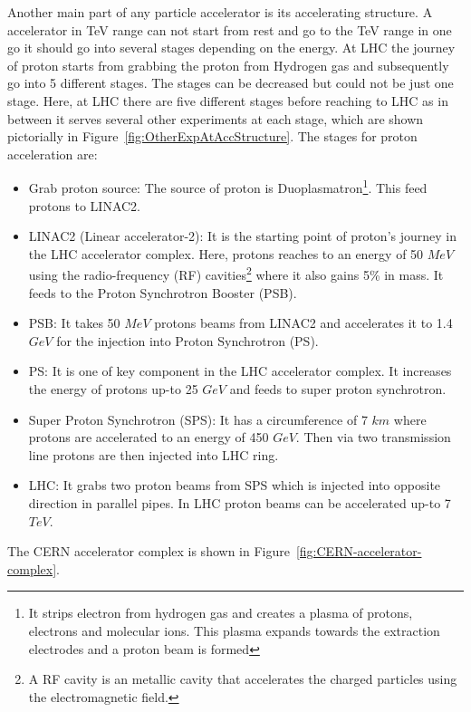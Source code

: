 Another main part of any particle accelerator is its accelerating structure. A accelerator in TeV range can not start from rest and go to the TeV range in one go it should go into several stages depending on the energy. At LHC the journey of proton starts from grabbing the proton from Hydrogen gas and subsequently go into 5 different stages. The stages can be decreased but could not be just one stage. Here, at LHC there are five different stages before reaching to LHC as in between it serves several other experiments at each stage, which are shown pictorially in Figure~\ref{fig:OtherExpAtAccStructure}. The stages for proton acceleration are:
\begin{itemize}
    \item Grab proton source: The source of proton is Duoplasmatron\footnote{It strips electron from hydrogen gas and creates a plasma of protons, electrons and molecular ions. This plasma expands towards the extraction electrodes and a proton beam is formed}\cite{LHC-tdr-vol3}. This feed protons to LINAC2.
    \item LINAC2 (Linear accelerator-2): It is the starting point of proton's journey in the LHC accelerator complex. Here, protons reaches to an energy of 50 $MeV$ using the radio-frequency (RF) cavities\footnote{A RF cavity is an metallic cavity that accelerates the charged particles using the electromagnetic field.} where it also gains 5\% in mass. It feeds to the Proton Synchrotron Booster (PSB).
    \item PSB: It takes 50 $MeV$ protons beams from LINAC2 and accelerates it to 1.4 $GeV$ for the injection into Proton Synchrotron (PS).
    \item PS: It is one of key component in the LHC accelerator complex. It increases the energy of protons up-to 25 $GeV$ and feeds to super proton synchrotron.
    \item Super Proton Synchrotron (SPS): It has a circumference of 7 $km$ where protons are accelerated to an energy of 450 $GeV$. Then via two transmission line protons are then injected into LHC ring.
    \item LHC: It grabs two proton beams from SPS which is injected into opposite direction in parallel pipes. In LHC proton beams can be accelerated up-to 7 $TeV$.
\end{itemize}
The CERN accelerator complex is shown in Figure~\ref{fig:CERN-accelerator-complex}.  

